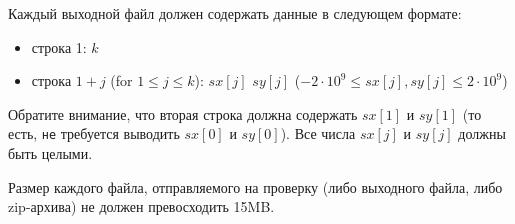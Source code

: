 Каждый выходной файл должен содержать данные в следующем формате:
\begin{itemize}
\item строка 1: $k$
\item строка $1+j$ (for $1 \leq j \leq k$): $sx[j]$ $sy[j]$ ($-2 \cdot {10}^9 \leq sx[j], sy[j] \leq 2 \cdot {10}^9 $)
\end{itemize}

Обратите внимание, что вторая строка должна содержать $sx[1]$ и $sy[1]$ (то есть, \texttt{не} требуется выводить $sx[0]$ и $sy[0]$). Все числа $sx[j]$ и $sy[j]$ должны быть целыми.

Размер каждого файла, отправляемого на проверку (либо выходного файла,
либо zip-архива) не должен превосходить 15MB.